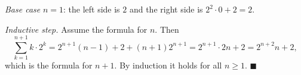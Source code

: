 \emph{Base case} $n=1$: the left side is $2$ and the right side is $2^2\cdot0+2=2$.

\emph{Inductive step.} Assume the formula for $n$. Then
\[\sum_{k=1}^{n+1}k\cdot2^k=2^{n+1}(n-1)+2+(n+1)2^{n+1}=2^{n+1}\cdot2n+2=2^{n+2}n+2,\]
which is the formula for $n+1$. By induction it holds for all $n\ge1$. $\blacksquare$
